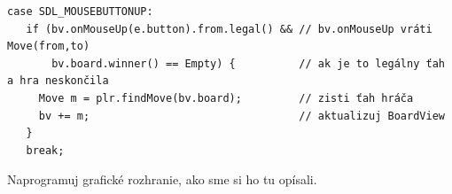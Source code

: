 \begin{lstlisting}
case SDL_MOUSEBUTTONUP:
   if (bv.onMouseUp(e.button).from.legal() && // bv.onMouseUp vráti Move(from,to)
       bv.board.winner() == Empty) {          // ak je to legálny ťah a hra neskončila
     Move m = plr.findMove(bv.board);         // zisti ťah hráča
     bv += m;                                 // aktualizuj BoardView
   }
   break;
\end{lstlisting}

\begin{uloha}
  Naprogramuj grafické rozhranie, ako sme si ho tu opísali.
\end{uloha}



